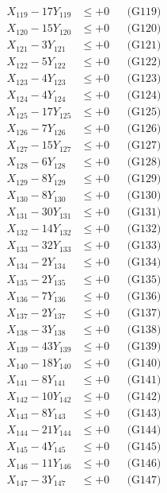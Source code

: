 \documentclass[a4paper,10pt]{article}
\begin{document}
{\begin{align}
X_{119} - 17Y_{119} &\leq +0 && \text{(G119)} \\
X_{120} - 15Y_{120} &\leq +0 && \text{(G120)} \\
X_{121} - 3Y_{121} &\leq +0 && \text{(G121)} \\
X_{122} - 5Y_{122} &\leq +0 && \text{(G122)} \\
X_{123} - 4Y_{123} &\leq +0 && \text{(G123)} \\
\allowbreak
X_{124} - 4Y_{124} &\leq +0 && \text{(G124)} \\
X_{125} - 17Y_{125} &\leq +0 && \text{(G125)} \\
X_{126} - 7Y_{126} &\leq +0 && \text{(G126)} \\
X_{127} - 15Y_{127} &\leq +0 && \text{(G127)} \\
X_{128} - 6Y_{128} &\leq +0 && \text{(G128)} \\
X_{129} - 8Y_{129} &\leq +0 && \text{(G129)} \\
X_{130} - 8Y_{130} &\leq +0 && \text{(G130)} \\
X_{131} - 30Y_{131} &\leq +0 && \text{(G131)} \\
X_{132} - 14Y_{132} &\leq +0 && \text{(G132)} \\
X_{133} - 32Y_{133} &\leq +0 && \text{(G133)} \\
\allowbreak
X_{134} - 2Y_{134} &\leq +0 && \text{(G134)} \\
X_{135} - 2Y_{135} &\leq +0 && \text{(G135)} \\
X_{136} - 7Y_{136} &\leq +0 && \text{(G136)} \\
X_{137} - 2Y_{137} &\leq +0 && \text{(G137)} \\
X_{138} - 3Y_{138} &\leq +0 && \text{(G138)} \\
X_{139} - 43Y_{139} &\leq +0 && \text{(G139)} \\
X_{140} - 18Y_{140} &\leq +0 && \text{(G140)} \\
X_{141} - 8Y_{141} &\leq +0 && \text{(G141)} \\
X_{142} - 10Y_{142} &\leq +0 && \text{(G142)} \\
X_{143} - 8Y_{143} &\leq +0 && \text{(G143)} \\
\allowbreak
X_{144} - 21Y_{144} &\leq +0 && \text{(G144)} \\
X_{145} - 4Y_{145} &\leq +0 && \text{(G145)} \\
X_{146} - 11Y_{146} &\leq +0 && \text{(G146)} \\
X_{147} - 3Y_{147} &\leq +0 && \text{(G147)} \\

\end{align}}
\end{document}
